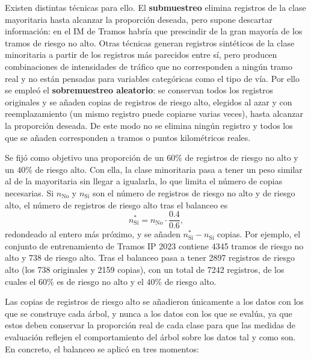 \documentclass[twoside,a4paper,12pt,onecolumn,openany]{book}
\begin{document}
\vspace{0.5cm}
 
Existen distintas técnicas para ello. El \textbf{submuestreo} elimina registros de la clase mayoritaria hasta alcanzar la proporción deseada, pero supone descartar información: en el IM de Tramos habría que prescindir de la gran mayoría de los tramos de riesgo no alto. Otras técnicas generan registros sintéticos de la clase minoritaria a partir de los registros más parecidos entre sí, pero producen combinaciones de intensidades de tráfico que no corresponden a ningún tramo real y no están pensadas para variables categóricas como el tipo de vía. Por ello se empleó el \textbf{sobremuestreo aleatorio}: se conservan todos los registros originales y se añaden copias de registros de riesgo alto, elegidos al azar y con reemplazamiento (un mismo registro puede copiarse varias veces), hasta alcanzar la proporción deseada. De este modo no se elimina ningún registro y todos los que se añaden corresponden a tramos o puntos kilométricos reales.
 
\vspace{0.5cm}
 
Se fijó como objetivo una proporción de un $60\%$ de registros de riesgo no alto y un $40\%$ de riesgo alto. Con ella, la clase minoritaria pasa a tener un peso similar al de la mayoritaria sin llegar a igualarla, lo que limita el número de copias necesarias. Si $n_{\text{No}}$ y $n_{\text{Sí}}$ son el número de registros de riesgo no alto y de riesgo alto, el número de registros de riesgo alto tras el balanceo es
\begin{equation*}
n^{*}_{\text{Sí}} = n_{\text{No}} \cdot \frac{0.4}{0.6},
\end{equation*}
redondeado al entero más próximo, y se añaden $n^{*}_{\text{Sí}} - n_{\text{Sí}}$ copias. Por ejemplo, el conjunto de entrenamiento de Tramos IP 2023 contiene 4345 tramos de riesgo no alto y 738 de riesgo alto. Tras el balanceo pasa a tener 2897 registros de riesgo alto (los 738 originales y 2159 copias), con un total de 7242 registros, de los cuales el $60\%$ es de riesgo no alto y el $40\%$ de riesgo alto.
 
\vspace{0.5cm}
 
Las copias de registros de riesgo alto se añadieron únicamente a los datos con los que se construye cada árbol, y nunca a los datos con los que se evalúa, ya que estos deben conservar la proporción real de cada clase para que las medidas de evaluación reflejen el comportamiento del árbol sobre los datos tal y como son. En concreto, el balanceo se aplicó en tres momentos:
\end{document}
